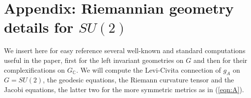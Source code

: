 \documentclass[12pt,reqno]{amsart}\usepackage{amssymb,amsmath,amscd,epsfig,amsthm,enumerate,import,eufrak}
\theoremstyle{definition}
\theoremstyle{remark}
\numberwithin{equation}{section}
\theoremstyle{plain}
\theoremstyle{definition}
\def \c {\mathbb{C}}
\def \vs {\vskip 2mm}
\theoremstyle{remark}
\numberwithin{theorem}{section}
\begin{document}
\section{Appendix: Riemannian geometry details for $SU(2)$} \label{sec:app}
%
%
We insert here for easy reference several well-known and standard computations useful in the paper, first for the left invariant geometries on $G$ and then for their complexifications on $G_{\c}$. We will compute the Levi-Civita connection of $g_A$ on $G = SU(2)$, the geodesic equations, the Riemann curvature tensor and the Jacobi equations, the latter two for the more symmetric metrics as in (\ref{eqn:A}).
%
%
%
%
%
%
%
\end{document}
